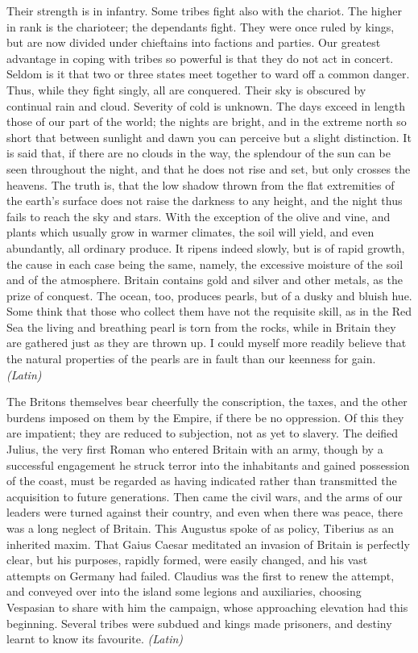 Their strength is in infantry. Some tribes fight also with the chariot. The higher in rank is the charioteer; the dependants fight. They were once ruled by kings, but are now divided under chieftains into factions and parties. Our greatest advantage in coping with tribes so powerful is that they do not act in concert. Seldom is it that two or three states meet together to ward off a common danger. Thus, while they fight singly, all are conquered. Their sky is obscured by continual rain and cloud. Severity of cold is unknown. The days exceed in length those of our part of the world; the nights are bright, and in the extreme north so short that between sunlight and dawn you can perceive but a slight distinction. It is said that, if there are no clouds in the way, the splendour of the sun can be seen throughout the night, and that he does not rise and set, but only crosses the heavens. The truth is, that the low shadow thrown from the flat extremities of the earth's surface does not raise the darkness to any height, and the night thus fails to reach the sky and stars. With the exception of the olive and vine, and plants which usually grow in warmer climates, the soil will yield, and even abundantly, all ordinary produce. It ripens indeed slowly, but is of rapid growth, the cause in each case being the same, namely, the excessive moisture of the soil and of the atmosphere. Britain contains gold and silver and other metals, as the prize of conquest. The ocean, too, produces pearls, but of a dusky and bluish hue. Some think that those who collect them have not the requisite skill, as in the Red Sea the living and breathing pearl is torn from the rocks, while in Britain they are gathered just as they are thrown up. I could myself more readily believe that the natural properties of the pearls are in fault than our keenness for gain. \emph{(Latin)}


The Britons themselves bear cheerfully the conscription, the taxes, and the other burdens imposed on them by the Empire, if there be no oppression. Of this they are impatient; they are reduced to subjection, not as yet to slavery. The deified Julius, the very first Roman who entered Britain with an army, though by a successful engagement he struck terror into the inhabitants and gained possession of the coast, must be regarded as having indicated rather than transmitted the acquisition to future generations. Then came the civil wars, and the arms of our leaders were turned against their country, and even when there was peace, there was a long neglect of Britain. This Augustus spoke of as policy, Tiberius as an inherited maxim. That Gaius Caesar meditated an invasion of Britain is perfectly clear, but his purposes, rapidly formed, were easily changed, and his vast attempts on Germany had failed. Claudius was the first to renew the attempt, and conveyed over into the island some legions and auxiliaries, choosing Vespasian to share with him the campaign, whose approaching elevation had this beginning. Several tribes were subdued and kings made prisoners, and destiny learnt to know its favourite. \emph{(Latin)}

